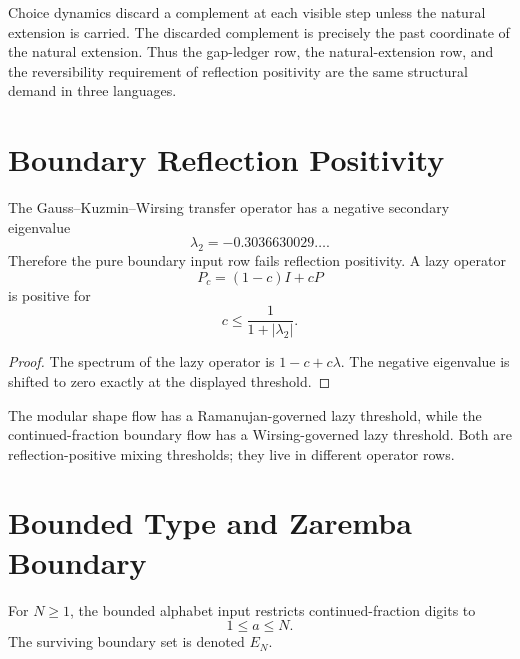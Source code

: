 \begin{principle}
\label{prin:innovation-input-boundary-gap-ledger-natural-extension}
Choice dynamics discard a complement at each visible step unless the
natural extension is carried. The discarded complement is precisely the
past coordinate of the natural extension. Thus the gap-ledger row, the
natural-extension row, and the reversibility requirement of reflection
positivity are the same structural demand in three languages.
\end{principle}

\section{Boundary Reflection Positivity}
\label{sec:innovation-input-boundary-reflection-positivity}

\begin{theorem}
\label{thm:innovation-input-boundary-wirsing-obstruction}
The Gauss--Kuzmin--Wirsing transfer operator has a negative secondary
eigenvalue
$$
\lambda_2=-0.3036630029\ldots .
$$
Therefore the pure boundary input row fails reflection positivity. A lazy
operator
$$
P_c=(1-c)I+cP
$$
is positive for
$$
c\le\frac{1}{1+|\lambda_2|}.
$$
\end{theorem}

\begin{proof}
The spectrum of the lazy operator is $1-c+c\lambda$. The negative
eigenvalue is shifted to zero exactly at the displayed threshold.
\end{proof}

\begin{principle}
\label{prin:innovation-input-boundary-two-mixing-thresholds}
The modular shape flow has a Ramanujan-governed lazy threshold, while the
continued-fraction boundary flow has a Wirsing-governed lazy threshold.
Both are reflection-positive mixing thresholds; they live in different
operator rows.
\end{principle}

\section{Bounded Type and Zaremba Boundary}
\label{sec:innovation-input-boundary-bounded-type-zaremba}

\begin{definition}
\label{def:innovation-input-boundary-bounded-alphabet}
For $N\ge1$, the bounded alphabet input restricts continued-fraction digits
to
$$
1\le a\le N.
$$
The surviving boundary set is denoted $E_N$.
\end{definition}

